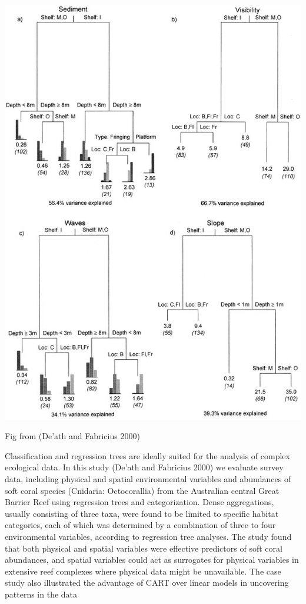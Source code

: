 \documentclass[
  letterpaper,
  DIV=11,
  numbers=noendperiod]{scrreprt}
\begin{document}
\includegraphics{CART.png}

Fig from (De'ath and Fabricius 2000)

Classification and regression trees are ideally suited for the analysis
of complex ecological data. In this study (De'ath and Fabricius 2000) we
evaluate survey data, including physical and spatial environmental
variables and abundances of soft coral species (Cnidaria: Octocorallia)
from the Australian central Great Barrier Reef using regression trees
and categorization. Dense aggregations, usually consisting of three
taxa, were found to be limited to specific habitat categories, each of
which was determined by a combination of three to four environmental
variables, according to regression tree analyses. The study found that
both physical and spatial variables were effective predictors of soft
coral abundances, and spatial variables could act as surrogates for
physical variables in extensive reef complexes where physical data might
be unavailable. The case study also illustrated the advantage of CART
over linear models in uncovering patterns in the data\hspace{0pt}
\end{document}
